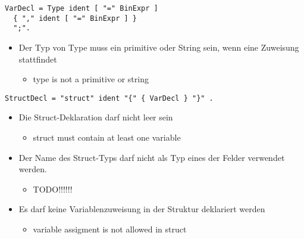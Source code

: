 
\begin{samepage}
\begin{lstlisting}[language=EBNF]
VarDecl = Type ident [ "=" BinExpr ]
  { "," ident [ "=" BinExpr ] }
  ";".
\end{lstlisting}
\begin{itemize}
  \item Der Typ von Type muss ein primitive oder String sein, wenn eine Zuweisung stattfindet
  \begin{itemize}
    \item type is not a primitive or string
  \end{itemize}
\end{itemize}
\end{samepage}


\begin{samepage}
\begin{lstlisting}[language=EBNF]
StructDecl = "struct" ident "{" { VarDecl } "}" .
\end{lstlisting}
\begin{itemize}
  \item Die Struct-Deklaration darf nicht leer sein
  \begin{itemize}
    \item struct must contain at least one variable
  \end{itemize}
  \item Der Name des Struct-Typs darf nicht als Typ eines der Felder verwendet werden.
  \begin{itemize}
    \item TODO!!!!!!
  \end{itemize}
  \item Es darf keine Variablenzuweisung in der Struktur deklariert werden
  \begin{itemize}
    \item variable assigment is not allowed in struct
  \end{itemize}
\end{itemize}
\end{samepage}


